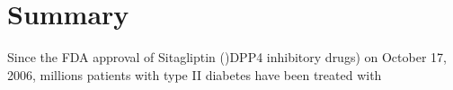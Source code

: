 \section{\label{chap:Sum} Summary}
Since the FDA approval of Sitagliptin ()DPP4 inhibitory drugs) on October 17, 2006, millions patients with type II diabetes have been treated with 
